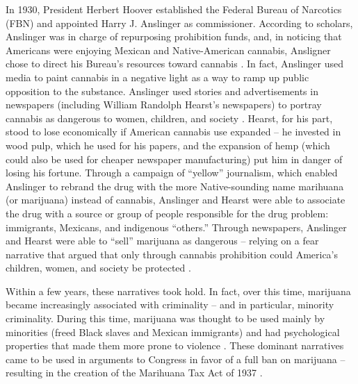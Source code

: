 In 1930, President Herbert Hoover established the Federal Bureau of Narcotics (FBN) and appointed Harry J. Anslinger as commissioner. According to scholars, Anslinger was in charge of repurposing prohibition funds, and, in noticing that Americans were enjoying Mexican and Native-American cannabis, Ansligner chose to direct his Bureau's resources toward cannabis \citep{newhart_and_dolphin_2018}. In fact, Anslinger used media to paint cannabis in a negative light as a way to ramp up public opposition to the substance. Anslinger used stories and advertisements in newspapers (including William Randolph Hearst's newspapers) to portray cannabis as dangerous to women, children, and society \citep{mosher_and_akins_2019}. Hearst, for his part, stood to lose economically if American cannabis use expanded -- he invested in wood pulp, which he used for his papers, and the expansion of hemp (which could also be used for cheaper newspaper manufacturing) put him in danger of losing his fortune. Through a campaign of ``yellow'' journalism, which enabled Anslinger to rebrand the drug with the more Native-sounding name marihuana (or marijuana) instead of cannabis, Anslinger and Hearst were able to associate the drug with a source or group of people responsible for the drug problem: immigrants, Mexicans, and indigenous ``others.'' Through newspapers, Anslinger and Hearst were able to ``sell'' marijuana as dangerous -- relying on a fear narrative that argued that only through cannabis prohibition could America's children, women, and society be protected \citep{mosher_and_akins_2019,newhart_and_dolphin_2018,rosenthal_and_kubby_1996}. 

Within a few years, these narratives took hold. In fact, over this time, marijuana became increasingly associated with criminality -- and in particular, minority criminality. During this time, marijuana was thought to be used mainly by minorities (freed Black slaves and Mexican immigrants) and had psychological properties that made them more prone to violence \citep{caulkins_et_al_2012,slaughter_1987}. These dominant narratives came to be used in arguments to Congress in favor of a full ban on marijuana -- resulting in the creation of the Marihuana Tax Act of 1937 \citep{newhart_and_dolphin_2018}. 



